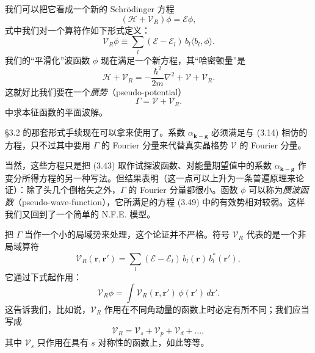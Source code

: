 我们可以把它看成一个新的 Schrödinger 方程
\begin{equation*}
(\mathcal{H}+\mathcal{V}_R)\phi=\mathcal{E}\phi,\tag{3.49}
\end{equation*}
式中我们对一个算符作如下形式定义：
\begin{equation*}
\mathcal{V}_R\phi\equiv\sum_l(\mathcal{E}-\mathcal{E}_l)\,b_l\langle b_l,\phi\rangle.\tag{3.50}
\end{equation*}
我们的“平滑化”波函数 $\phi$ 现在满足一个新方程，其“哈密顿量”是
\begin{equation*}
\mathcal{H}+\mathcal{V}_R=-\frac{\hbar^2}{2m}\nabla^2+\mathcal{V}+\mathcal{V}_R.\tag{3.51}
\end{equation*}
这就好比我们要在一个\emph{赝势}（pseudo-potential）
\begin{equation*}
\Gamma=\mathcal{V}+\mathcal{V}_R.\tag{3.52}
\end{equation*}
中求本征函数的平面波解。

§3.2 的那套形式手续现在可以拿来使用了。系数 $\alpha_{\mathbf{k}-\mathbf{g}}$ 必须满足与 (3.14) 相仿的方程，只不过其中要用 $\Gamma$ 的 Fourier 分量来代替真实晶格势 $\mathcal{V}$ 的 Fourier 分量。

当然，这些方程只是把 (3.43) 取作试探波函数、对能量期望值中的系数 $\alpha_{\mathbf{k}-\mathbf{g}}$ 作变分所得方程的另一种写法。但结果表明（这一点可以上升为一条普遍原理来论证）：除了头几个倒格矢之外，$\Gamma$ 的 Fourier 分量都很小。函数 $\phi$ 可以称为\emph{赝波函数}（pseudo-wave-function），它所满足的方程 (3.49) 中的有效势相对较弱。这样我们又回到了一个简单的 N.F.E. 模型。

把 $\Gamma$ 当作一个小的局域势来处理，这个论证并不严格。符号 $\mathcal{V}_R$ 代表的是一个非局域算符
\begin{equation*}
\mathcal{V}_R(\mathbf{r},\mathbf{r}')=\sum_l(\mathcal{E}-\mathcal{E}_l)\,b_l(\mathbf{r})\,b_l^{*}(\mathbf{r}'),\tag{3.53}
\end{equation*}
它通过下式起作用：
\begin{equation*}
\mathcal{V}_R\phi=\int\mathcal{V}_R(\mathbf{r},\mathbf{r}')\,\phi(\mathbf{r}')\,d\mathbf{r}'.\tag{3.54}
\end{equation*}
这告诉我们，比如说，$\mathcal{V}_R$ 作用在不同角动量的函数上时必定有所不同；我们应当写成
\begin{equation*}
\mathcal{V}_R=\mathcal{V}_s+\mathcal{V}_p+\mathcal{V}_d+\dots,\tag{3.55}
\end{equation*}
其中 $\mathcal{V}_s$ 只作用在具有 $s$ 对称性的函数上，如此等等。

